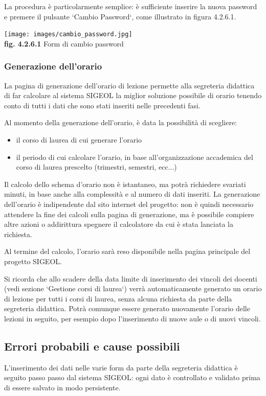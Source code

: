 \documentclass[11pt,a4paper]{article}
\begin{document}
La procedura è particolarmente semplice: è sufficiente inserire la nuova password e premere il pulsante `Cambio Password`, come illustrato in figura 4.2.6.1.

\begin{center}
	\texttt{[image: images/cambio\_password.jpg]}\\
	\textbf{fig. 4.2.6.1} Form di cambio password\\
\end{center}

\subsubsection{Generazione dell'orario}
La pagina di generazione dell'orario di lezione permette alla segreteria didattica di far calcolare al sistema SIGEOL la miglior soluzione possibile di orario tenendo conto di tutti i dati che sono stati inseriti nelle precedenti fasi.

Al momento della generazione dell'orario, è data la possibilità di scegliere:
\begin{itemize}
 \item il corso di laurea di cui generare l'orario
 \item il periodo di cui calcolare l'orario, in base all'organizzazione accademica del corso di laurea prescelto (trimestri, semestri, ecc...)
\end{itemize}
Il calcolo dello schema d'orario non è istantaneo, ma potrà richiedere svariati minuti, in base anche alla complessità e al numero di dati inseriti.
La generazione dell'orario è indipendente dal sito internet del progetto: non è quindi necessario attendere la fine dei calcoli sulla pagina di generazione, ma è possibile compiere altre azioni o addirittura spegnere il calcolatore da cui è stata lanciata la richiesta.

Al termine del calcolo, l'orario sarà reso disponibile nella pagina principale del progetto SIGEOL.

Si ricorda che allo scadere della data limite di inserimento dei vincoli dei docenti (vedi sezione `Gestione corsi di laurea`) verrà automaticamente generato un orario di lezione per tutti i corsi di laurea, senza alcuna richiesta da parte della segreteria didattica. Potrà comunque essere generato nuovamente l'orario delle lezioni in seguito, per esempio dopo l'inserimento di nuove aule o di nuovi vincoli.
\subsection{Errori probabili e cause possibili}
L'inserimento dei dati nelle varie form da parte della segreteria didattica è seguito passo passo dal sistema SIGEOL: ogni dato è controllato e validato prima di essere salvato in modo persistente.
\end{document}
